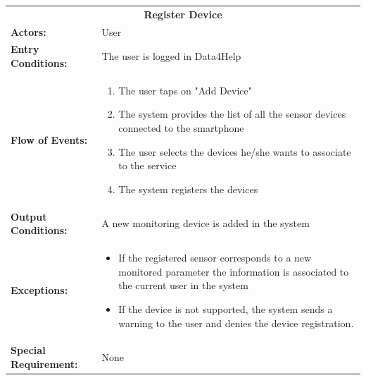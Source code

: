 \begin{table}[htb]
	\centering
	{\renewcommand{\arraystretch}{1.5}%
		\begin{tabular}{|@{\hspace{2em}} p{4cm} @{}| p{11cm} @{\qquad}|}
			\cline{1-2}
			\multicolumn{2}{|c|}{\textbf{Register Device}} \\ \cline{1-2}
			\textbf{Actors:} & User \\ \cline{1-2}
			\textbf{Entry Conditions:} &  The user is logged in Data4Help \\ \cline{1-2}
			\textbf{Flow of Events:} &
			 \begin{enumerate}[itemsep=-0.2em, topsep=0em]
				\item The user taps on "Add Device"
				\item The system provides the list of all the sensor devices connected to the smartphone
				\item The user selects the devices he/she wants to associate to the service
				\item The system registers the devices
			\end{enumerate} \\ \cline{1-2}
			\textbf{Output Conditions:} & A new monitoring device is added in the system \\ \hline
			\textbf{Exceptions:} & 
			\begin{itemize}[itemsep=-0.2em, topsep=-2em, partopsep=-1em]
				\item If the registered sensor corresponds to a new monitored parameter the information is associated to the current user in the system 
				\item If the device is not supported, the system sends a warning to the user and denies the device registration.
			\end{itemize} \\ \cline{1-2}
			\textbf{Special Requirement:} & None \\ \hline
	\end{tabular}} \quad
\end{table}

